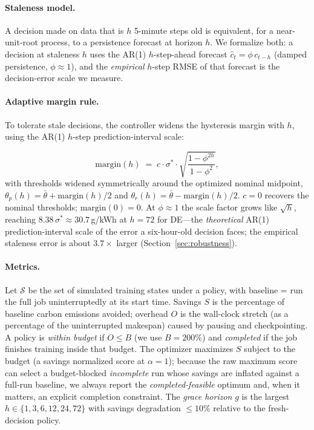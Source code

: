 \documentclass[sigconf,nonacm=false]{acmart}
\begin{document}
\paragraph{Staleness model.}
A decision made on data that is $h$ 5-minute steps old is equivalent, for a
near-unit-root process, to a persistence forecast at horizon $h$. We formalize
both: a decision at staleness $h$ uses the AR(1) $h$-step-ahead forecast
$\hat{c}_t = \phi\, c_{t-h}$ (damped persistence, $\phi\approx1$), and the
\emph{empirical} $h$-step RMSE of that forecast is the decision-error scale we
measure.

\paragraph{Adaptive margin rule.}
{\sloppy To tolerate stale decisions, the controller widens the hysteresis margin
with $h$, using the AR(1) $h$-step prediction-interval scale: \par}
\begin{equation}
  \label{eq:margin}
  \mathrm{margin}(h) \;=\; c \cdot \sigma^* \cdot
    \sqrt{\frac{1-\phi^{2h}}{1-\phi^2}},
\end{equation}
with thresholds widened symmetrically around the optimized nominal midpoint,
$\theta_p(h) = \bar\theta + \mathrm{margin}(h)/2$ and
$\theta_r(h) = \bar\theta - \mathrm{margin}(h)/2$. $c=0$ recovers the nominal
thresholds; $\mathrm{margin}(0)=0$. At $\phi\approx1$ the scale factor grows
like $\sqrt{h}$, reaching $8.38\,\sigma^*\approx30.7$\,g/kWh at $h{=}72$ for
DE---the \emph{theoretical} AR(1) prediction-interval scale of the error a
six-hour-old decision faces; the empirical staleness error is about
$3.7\times$ larger (Section~\ref{sec:robustness}).

\paragraph{Metrics.}
Let $\mathcal{S}$ be the set of simulated training states under a policy, with
baseline = run the full job uninterruptedly at its start time. Savings
$S$ is the percentage of baseline carbon emissions avoided; overhead $O$ is the
wall-clock stretch (as a percentage of the uninterrupted makespan) caused by
pausing and checkpointing. A policy is \emph{within budget} if $O \le B$
(we use $B{=}200\%$) and \emph{completed} if the job finishes training inside
that budget. The optimizer maximizes $S$ subject to the budget (a savings
normalized score at $\alpha{=}1$); because the raw maximum score can select a
budget-blocked \emph{incomplete} run whose savings are inflated against a
full-run baseline, we always report the \emph{completed-feasible} optimum and,
when it matters, an explicit completion constraint. The \emph{grace horizon}
$g$ is the largest $h\in\{1,3,6,12,24,72\}$ with savings degradation
$\le 10\%$ relative to the fresh-decision policy.
\end{document}

